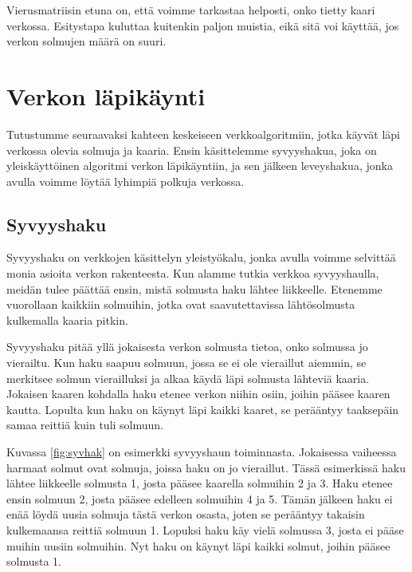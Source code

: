 Vierusmatriisin etuna on, että voimme tarkastaa helposti,
onko tietty kaari verkossa.
Esitystapa kuluttaa kuitenkin paljon muistia,
eikä sitä voi käyttää, jos verkon solmujen määrä on suuri.

\section{Verkon läpikäynti}

Tutustumme seuraavaksi kahteen keskeiseen verkkoalgoritmiin,
jotka käyvät läpi verkossa olevia solmuja ja kaaria.
Ensin käsittelemme syvyyshakua, joka on yleiskäyttöinen algoritmi
verkon läpikäyntiin, ja sen jälkeen leveyshakua,
jonka avulla voimme löytää lyhimpiä polkuja verkossa.

\subsection{Syvyyshaku}

Syvyyshaku on verkkojen käsittelyn yleistyökalu,
jonka avulla voimme selvittää monia asioita verkon rakenteesta.
Kun alamme tutkia verkkoa syvyyshaulla,
meidän tulee päättää ensin, mistä solmusta haku lähtee liikkeelle.
Etenemme vuorollaan kaikkiin solmuihin, jotka ovat saavutettavissa
lähtösolmusta kulkemalla kaaria pitkin.

Syvyyshaku pitää yllä jokaisesta verkon solmusta tietoa,
onko solmussa jo vierailtu.
Kun haku saapuu solmuun, jossa se ei ole vieraillut aiemmin,
se merkitsee solmun vierailluksi ja alkaa käydä
läpi solmusta lähteviä kaaria.
Jokaisen kaaren kohdalla haku etenee verkon niihin osiin,
joihin pääsee kaaren kautta.
Lopulta kun haku on käynyt läpi kaikki kaaret,
se perääntyy taaksepäin samaa reittiä kuin tuli solmuun.

Kuvassa \ref{fig:syvhak} on esimerkki syvyyshaun toiminnasta.
Jokaisessa vaiheessa harmaat solmut ovat solmuja,
joissa haku on jo vieraillut.
Tässä esimerkissä haku lähtee liikkeelle solmusta 1,
josta pääsee kaarella solmuihin 2 ja 3.
Haku etenee ensin solmuun 2, josta pääsee edelleen
solmuihin 4 ja 5.
Tämän jälkeen haku ei enää löydä uusia solmuja
tästä verkon osasta, joten se perääntyy takaisin
kulkemaansa reittiä solmuun 1.
Lopuksi haku käy vielä solmussa 3,
josta ei pääse muihin uusiin solmuihin.
Nyt haku on käynyt läpi kaikki solmut,
joihin pääsee solmusta 1.

